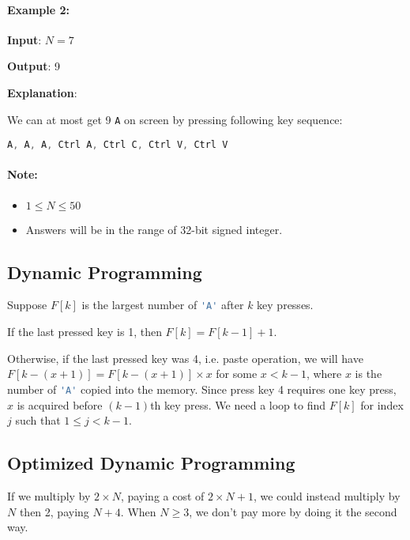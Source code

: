 \paragraph{Example 2:}

\begin{flushleft}
\textbf{Input}: $N = 7$

\textbf{Output}: 9

\textbf{Explanation}: 

We can at most get 9 \lstinline[language=Java, basicstyle=\small\ttfamily, keywordstyle=\bfseries\color{green!40!black}]|A| on screen by pressing following key sequence:

\lstinline[language=Java, basicstyle=\small\ttfamily, keywordstyle=\bfseries\color{green!40!black}]|A, A, A, Ctrl A, Ctrl C, Ctrl V, Ctrl V|
\end{flushleft}

\paragraph{Note:}

\begin{itemize}
\item $1 \leq N \leq 50$
\item Answers will be in the range of 32-bit signed integer.
\end{itemize}

\subsection{Dynamic Programming}
Suppose $F[k]$ is the largest number of \lstinline[language=Java, basicstyle=\small\ttfamily, keywordstyle=\bfseries\color{green!40!black}]|'A'| after $k$ key presses.

If the last pressed key is 1, then $F[k] = F[k-1]+1$.

Otherwise, if the last pressed key was 4, i.e. paste operation, we will have $F[k-(x+1)] = F[k-(x+1)] \times x$ for some $x < k-1$, where $x$ is the number of \lstinline[language=Java, basicstyle=\small\ttfamily, keywordstyle=\bfseries\color{green!40!black}]|'A'| copied into the memory. Since press key 4 requires one key press, $x$ is acquired before $(k-1)$th key press. We need a loop to find $F[k]$ for index $j$ such that $1\leq j < k-1$.

\subsection{Optimized Dynamic Programming}
If we multiply by $2\times N$, paying a cost of $2\times N+1$, we could instead multiply by $N$ then 2, paying $N+4$. When $N \geq 3$, we don't pay more by doing it the second way.


